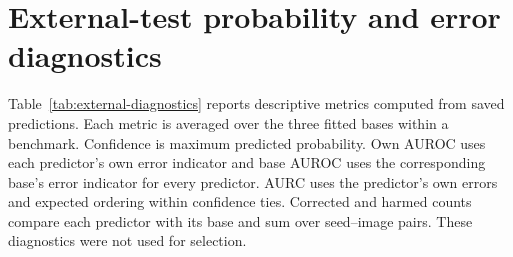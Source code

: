 \section{External-test probability and error diagnostics}
\label{sec:external-diagnostics}

Table~\ref{tab:external-diagnostics} reports descriptive metrics computed
from saved predictions. Each metric is averaged over the three fitted bases
within a benchmark. Confidence is maximum predicted probability. Own AUROC
uses each predictor's own error indicator and base AUROC uses the corresponding
base's error indicator for every predictor. AURC uses the predictor's own
errors and expected ordering within confidence ties. Corrected and harmed
counts compare each predictor with its base and sum over seed--image pairs.
These diagnostics were not used for selection.

\begin{table}[h]
\centering
\small
\setlength{\tabcolsep}{4pt}
\caption{Probability quality, error ranking and paired changes in correctness
on the two external test sets. Corr. and Harm count corrected and introduced
errors, respectively.}
\label{tab:external-diagnostics}

\end{table}
